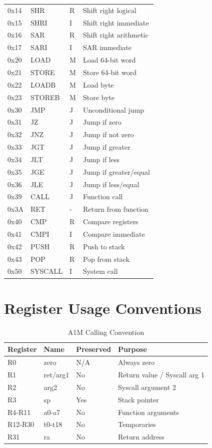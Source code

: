 \documentclass[12pt,a4paper,oneside]{book}
\begin{document}
\begin{table}[H]
\begin{tabularx}{\textwidth}{|l|l|l|X|}
0x14 & SHR & R & Shift right logical \\
0x15 & SHRI & I & Shift right immediate \\
0x16 & SAR & R & Shift right arithmetic \\
0x17 & SARI & I & SAR immediate \\
0x20 & LOAD & M & Load 64-bit word \\
0x21 & STORE & M & Store 64-bit word \\
0x22 & LOADB & M & Load byte \\
0x23 & STOREB & M & Store byte \\
0x30 & JMP & J & Unconditional jump \\
0x31 & JZ & J & Jump if zero \\
0x32 & JNZ & J & Jump if not zero \\
0x33 & JGT & J & Jump if greater \\
0x34 & JLT & J & Jump if less \\
0x35 & JGE & J & Jump if greater/equal \\
0x36 & JLE & J & Jump if less/equal \\
0x39 & CALL & J & Function call \\
0x3A & RET & - & Return from function \\
0x40 & CMP & R & Compare registers \\
0x41 & CMPI & I & Compare immediate \\
0x42 & PUSH & R & Push to stack \\
0x43 & POP & R & Pop from stack \\
0x50 & SYSCALL & I & System call \\
\hline
\end{tabularx}
\end{table}

\chapter{Register Usage Conventions}

\begin{table}[H]
\centering
\caption{A1M Calling Convention}
\begin{tabularx}{\textwidth}{|l|l|l|X|}
\hline
\textbf{Register} & \textbf{Name} & \textbf{Preserved} & \textbf{Purpose} \\
\hline
R0 & zero & N/A & Always zero \\
R1 & ret/arg1 & No & Return value / Syscall arg 1 \\
R2 & arg2 & No & Syscall argument 2 \\
R3 & sp & Yes & Stack pointer \\
R4-R11 & a0-a7 & No & Function arguments \\
R12-R30 & t0-t18 & No & Temporaries \\
R31 & ra & No & Return address \\
\hline
\end{tabularx}
\end{table}
\end{document}
